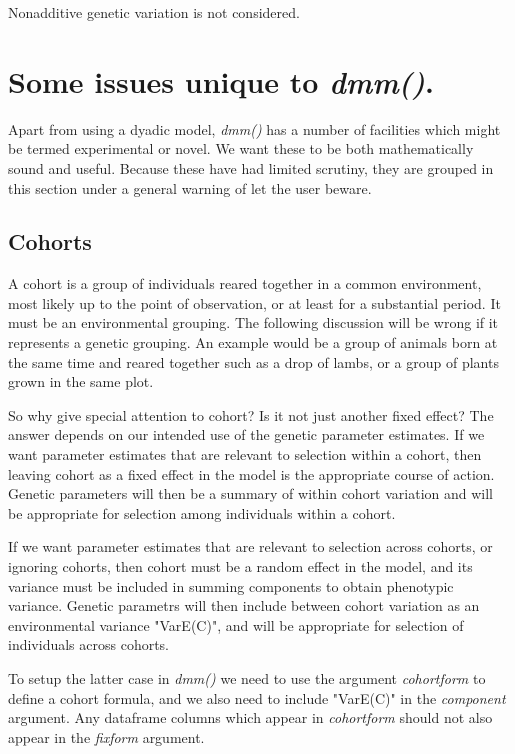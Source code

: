 \documentclass[titlepage]{article}  %
\begin{document}
 Nonadditive genetic variation is not considered.



\clearpage
\section{Some issues unique to {\em dmm()}.}
 Apart from using a dyadic model, {\em dmm()} has a number of facilities which might be termed experimental or novel. We want these to be both mathematically sound and useful. Because these have had limited scrutiny, they are grouped in this section under a general warning of let the user beware.

\subsection{Cohorts}
 A cohort is a group of individuals reared together in a common environment, most likely up to the point of observation, or at least for a substantial period. It must be an environmental grouping. The following discussion will be wrong if it represents a genetic grouping. An example would be a group of animals born at the same time and reared together such as a drop of lambs, or a group of plants grown in the same plot.

 So why give special attention to cohort? Is it not just another fixed effect? The answer depends on our intended use of the genetic parameter estimates. If we want parameter estimates that are relevant to selection within a cohort, then leaving cohort as a fixed effect in the model is the appropriate course of action. Genetic parameters will then be a summary of within cohort variation and will be appropriate for selection among individuals within a cohort.

If we want parameter estimates that are relevant to selection across cohorts, or ignoring cohorts, then cohort must be a random effect in the model, and its variance must be included in summing components to obtain phenotypic variance. Genetic parametrs will then include between cohort variation as an environmental variance "VarE(C)", and will be appropriate for selection of individuals across cohorts.

To setup the latter case in {\em dmm()} we need to use the argument {\em cohortform} to define a cohort formula, and we also need to include "VarE(C)" in the {\em component} argument. Any dataframe columns which appear in {\em cohortform} should not also appear in the {\em fixform} argument.
 
\end{document}
